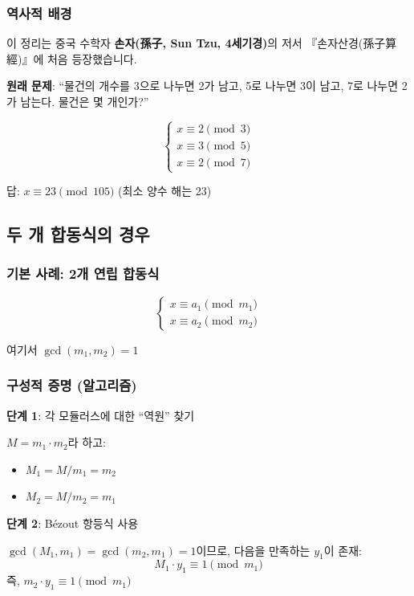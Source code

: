 \documentclass[11pt,a4paper]{article}
\theoremstyle{definition}
\theoremstyle{remark}
\begin{document}
\subsubsection{역사적 배경}

이 정리는 중국 수학자 \textbf{손자(孫子, Sun Tzu, 4세기경)}의 저서 『손자산경(孫子算經)』에 처음 등장했습니다.

\textbf{원래 문제}:
``물건의 개수를 3으로 나누면 2가 남고, 5로 나누면 3이 남고, 7로 나누면 2가 남는다. 물건은 몇 개인가?''

\[\begin{cases}
x \equiv 2 \pmod{3} \\
x \equiv 3 \pmod{5} \\
x \equiv 2 \pmod{7}
\end{cases}\]

답: $x \equiv 23 \pmod{105}$ (최소 양수 해는 23)

\subsection{두 개 합동식의 경우}

\subsubsection{기본 사례: 2개 연립 합동식}

\[\begin{cases}
x \equiv a_1 \pmod{m_1} \\
x \equiv a_2 \pmod{m_2}
\end{cases}\]

여기서 $\gcd(m_1, m_2) = 1$

\subsubsection{구성적 증명 (알고리즘)}

\textbf{단계 1}: 각 모듈러스에 대한 ``역원'' 찾기

$M = m_1 \cdot m_2$라 하고:
\begin{itemize}
    \item $M_1 = M/m_1 = m_2$
    \item $M_2 = M/m_2 = m_1$
\end{itemize}

\textbf{단계 2}: Bézout 항등식 사용

$\gcd(M_1, m_1) = \gcd(m_2, m_1) = 1$이므로, 다음을 만족하는 $y_1$이 존재:
\[M_1 \cdot y_1 \equiv 1 \pmod{m_1}\]
즉, $m_2 \cdot y_1 \equiv 1 \pmod{m_1}$
\end{document}
